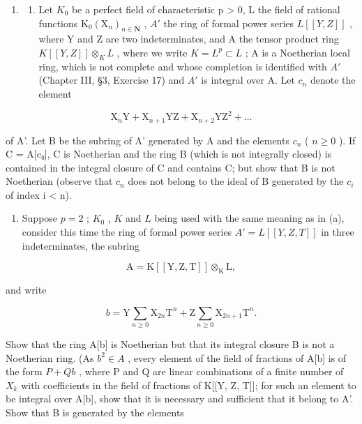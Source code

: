 \begin{enumerate}
\def\labelenumi{\arabic{enumi}.}
\setcounter{enumi}{20}
\tightlist
\item
  \begin{enumerate}
  \def\labelenumii{(\alph{enumii})}
  \tightlist
  \item
    Let \(K_{0}\) be a perfect field of characteristic p \textgreater{} 0, L the field of rational functions \(\mathrm{K}_{0}(\mathrm{X}_{n})_{n\in\mathbf{N}}\) , \(A'\) the ring of formal power series \(L[[Y,Z]]\) , where Y and Z are two indeterminates, and A the tensor product ring \(K[[Y,Z]]\otimes_{K}L\) , where we write \(K = L^{p} \subset L\) ; A is a Noetherian local ring, which is not complete and whose completion is identified with \(A'\) (Chapter III, §3, Exercise 17) and \(A'\) is integral over A. Let \(c_{n}\) denote the element
  \end{enumerate}
\end{enumerate}

\[
\mathrm{X} _ {n} \mathrm{Y} + \mathrm{X} _ {n + 1} \mathrm{YZ} + \mathrm{X} _ {n + 2} \mathrm{YZ} ^ {2} + \dots
\]

of A'. Let B be the subring of A' generated by A and the elements \(c_{n}\) ( \(n \geqslant 0\) ). If C = A{[}c₀{]}, C is Noetherian and the ring B (which is not integrally closed) is contained in the integral closure of C and contains C; but show that B is not Noetherian (observe that \(c_{n}\) does not belong to the ideal of B generated by the \(c_{i}\) of index i \textless{} n).

\begin{enumerate}
\def\labelenumi{(\alph{enumi})}
\setcounter{enumi}{1}
\tightlist
\item
  Suppose \(p = 2\) ; \(K_0\) , \(K\) and \(L\) being used with the same meaning as in (a), consider this time the ring of formal power series \(A' = L[[Y, Z, T]]\) in three indeterminates, the subring
\end{enumerate}

\[
\mathrm{A} = \mathrm{K} [ [ \mathrm{Y}, \mathrm{Z}, \mathrm{T} ] ] \otimes_ {\mathrm{K}} \mathrm{L},
\]

and write

\[
b = \mathrm{Y} \sum_ {n \geqslant 0} \mathrm{X} _ {2 n} \mathrm{T} ^ {n} + \mathrm{Z} \sum_ {n \geqslant 0} \mathrm{X} _ {2 n + 1} \mathrm{T} ^ {n}.
\]

Show that the ring A{[}b{]} is Noetherian but that its integral closure B is not a Noetherian ring. (As \(b^{2} \in A\) , every element of the field of fractions of A{[}b{]} is of the form \(P + Qb\) , where P and Q are linear combinations of a finite number of \(X_{k}\) with coefficients in the field of fractions of K{[}{[}Y, Z, T{]}{]}; for such an element to be integral over A{[}b{]}, show that it is necessary and sufficient that it belong to A'. Show that B is generated by the elements

